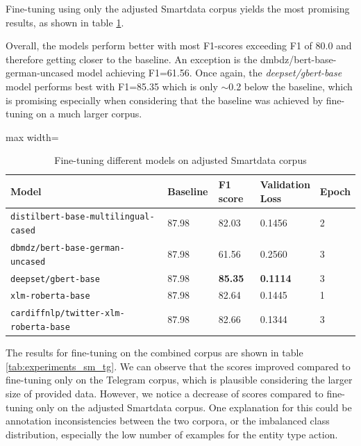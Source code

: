 Fine-tuning using only the adjusted Smartdata corpus yields the most promising results, as shown in table \ref{tab:experiments_sm}. 

Overall, the models perform better with most F1-scores exceeding F1 of 80.0 and therefore getting closer to the baseline. An exception is the dmbdz/bert-base-german-uncased model achieving F1=61.56. Once again, the \textit{deepset/gbert-base} model performs best with F1=85.35 which is only $\sim$0.2 below the baseline, which is promising especially when considering that the baseline was achieved by fine-tuning on a much larger corpus. 
 
\begin{table}[htp]
\caption{Fine-tuning different models on adjusted Smartdata corpus}
\label{tab:experiments_sm}
\centering
\begin{adjustbox}{max width=\textwidth}
\begin{tabular}{|p{0.7\linewidth}|p{0.15\linewidth}|p{0.15\linewidth}|p{0.15\linewidth}|p{0.15\linewidth}|}
\hline
\textbf{Model} & \textbf{Baseline} & \textbf{F1 score} & \textbf{Validation Loss} & \textbf{Epoch}\\ \hline 
\verb|distilbert-base-multilingual-cased|& 87.98 & 82.03 & 0.1456 & 2 \\ \hline
\verb|dbmdz/bert-base-german-uncased| & 87.98 & 61.56 & 0.2560 & 3 \\ \hline
\verb|deepset/gbert-base| & 87.98 & \textbf{85.35} & \textbf{0.1114} & 3\\ \hline
\verb|xlm-roberta-base| & 87.98 & 82.64 & 0.1445 & 1 \\ \hline
\verb|cardiffnlp/twitter-xlm-roberta-base|& 87.98 & 82.66 & 0.1344 & 3\\ \hline
\end{tabular}
\end{adjustbox}
\end{table}

The results for fine-tuning on the combined corpus are shown in table \ref{tab:experiments_sm_tg}. We can observe that the scores improved compared to fine-tuning only on the Telegram corpus, which is plausible considering the larger size of provided data. However, we notice a decrease of scores compared to fine-tuning only on the adjusted Smartdata corpus. One explanation for this could be annotation inconsistencies between the two corpora, or the imbalanced class distribution, especially the low number of examples for the entity type action.  

